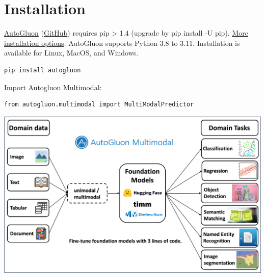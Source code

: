 


\section*{Installation}
\href{https://auto.gluon.ai/stable/index.html}{AutoGluon} (\href{https://github.com/awslabs/autogluon/}{GitHub}) requires pip > 1.4 (upgrade by pip install -U pip). \href{https://auto.gluon.ai/stable/index.html#installation}{More installation options}. AutoGluon supports Python 3.8 to 3.11. Installation is available for Linux, MacOS, and Windows.

\begin{verbatim}
pip install autogluon
\end{verbatim}

Import Autogluon Multimodal:

\begin{verbatim}
from autogluon.multimodal import MultiModalPredictor
\end{verbatim}

\begin{center}
\includegraphics[width=1.0\linewidth]{images/automm-intro.png}
\end{center}


